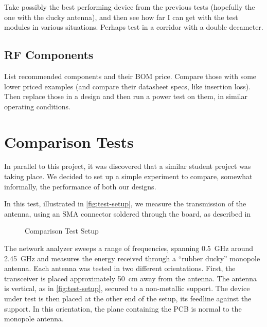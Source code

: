 Take possibly the best performing device from the previous tests (hopefully the
one with the ducky antenna), and then see how far I can get with the test
modules in various situations. Perhaps test in a corridor with a double
decameter.

\subsection{RF Components}

List recommended components and their BOM price. Compare those with some lower
priced examples (and compare their datasheet specs, like insertion loss). Then
replace those in a design and then run a power test on them, in similar
operating conditions.




\section{Comparison Tests}

In parallel to this project, it was discovered that a similar student project
was taking place. We decided to set up a simple experiment to compare, somewhat
informally, the performance of both our designs.

In this test, illustrated in \autoref{fig:test-setup}, we measure the
transmission of the antenna, using an SMA connector soldered through the board,
as described in %

\begin{figure}[htb]
  \begin{center}
  \end{center}
  \caption{Comparison Test Setup}
  \label{fig:test-setup}
\end{figure}

The network analyzer sweeps a range of frequencies, spanning \SI{0.5}{GHz}
around \SI{2.45}{GHz} and measures the energy received through a ``rubber
ducky'' monopole antenna. Each antenna was tested in two different orientations.
First, the transceiver is placed approximately \SI{50}{cm} away from the
antenna. The antenna is vertical, as in \autoref{fig:test-setup}, secured to
a non-metallic support. The device under test is then placed at the other end of
the setup, its feedline against the support. In this orientation, the plane
containing the PCB is normal to the monopole antenna.

